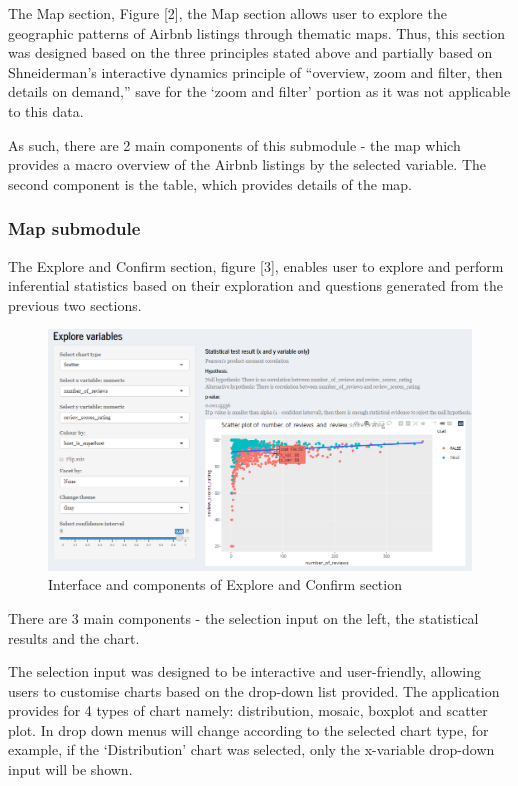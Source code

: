 \documentclass{acm_proc_article-sp}
\begin{document}
The Map section, Figure {[}2{]}, the Map section allows user to explore
the geographic patterns of Airbnb listings through thematic maps. Thus,
this section was designed based on the three principles stated above and
partially based on Shneiderman's interactive dynamics principle of
``overview, zoom and filter, then details on demand,'' save for the
`zoom and filter' portion as it was not applicable to this data.

As such, there are 2 main components of this submodule - the map which
provides a macro overview of the Airbnb listings by the selected
variable. The second component is the table, which provides details of
the map.

\hypertarget{map-submodule-1}{%
\subsubsection{Map submodule}\label{map-submodule-1}}

The Explore and Confirm section, figure {[}3{]}, enables user to explore
and perform inferential statistics based on their exploration and
questions generated from the previous two sections.

\begin{figure}[H]

{\centering \includegraphics[width=1\linewidth]{images/design_explore1} 

}

\caption{Interface and components of Explore and Confirm section}\label{fig:unnamed-chunk-3}
\end{figure}

There are 3 main components - the selection input on the left, the
statistical results and the chart.

The selection input was designed to be interactive and user-friendly,
allowing users to customise charts based on the drop-down list provided.
The application provides for 4 types of chart namely: distribution,
mosaic, boxplot and scatter plot. In drop down menus will change
according to the selected chart type, for example, if the `Distribution'
chart was selected, only the x-variable drop-down input will be shown.
\end{document}
